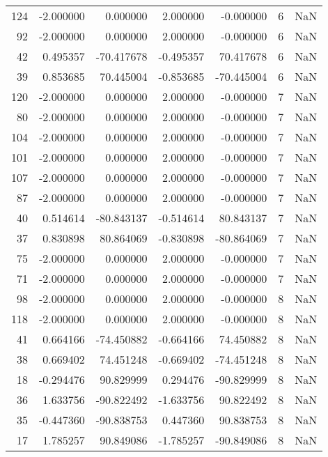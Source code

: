 \begin{tabular}{rrrrrrr}
124 & -2.000000 &    0.000000 &  2.000000 &   -0.000000 &           6 & NaN \\
 92 & -2.000000 &    0.000000 &  2.000000 &   -0.000000 &           6 & NaN \\
 42 &  0.495357 &  -70.417678 & -0.495357 &   70.417678 &           6 & NaN \\
 39 &  0.853685 &   70.445004 & -0.853685 &  -70.445004 &           6 & NaN \\
120 & -2.000000 &    0.000000 &  2.000000 &   -0.000000 &           7 & NaN \\
 80 & -2.000000 &    0.000000 &  2.000000 &   -0.000000 &           7 & NaN \\
104 & -2.000000 &    0.000000 &  2.000000 &   -0.000000 &           7 & NaN \\
101 & -2.000000 &    0.000000 &  2.000000 &   -0.000000 &           7 & NaN \\
107 & -2.000000 &    0.000000 &  2.000000 &   -0.000000 &           7 & NaN \\
 87 & -2.000000 &    0.000000 &  2.000000 &   -0.000000 &           7 & NaN \\
 40 &  0.514614 &  -80.843137 & -0.514614 &   80.843137 &           7 & NaN \\
 37 &  0.830898 &   80.864069 & -0.830898 &  -80.864069 &           7 & NaN \\
 75 & -2.000000 &    0.000000 &  2.000000 &   -0.000000 &           7 & NaN \\
 71 & -2.000000 &    0.000000 &  2.000000 &   -0.000000 &           7 & NaN \\
 98 & -2.000000 &    0.000000 &  2.000000 &   -0.000000 &           8 & NaN \\
118 & -2.000000 &    0.000000 &  2.000000 &   -0.000000 &           8 & NaN \\
 41 &  0.664166 &  -74.450882 & -0.664166 &   74.450882 &           8 & NaN \\
 38 &  0.669402 &   74.451248 & -0.669402 &  -74.451248 &           8 & NaN \\
 18 & -0.294476 &   90.829999 &  0.294476 &  -90.829999 &           8 & NaN \\
 36 &  1.633756 &  -90.822492 & -1.633756 &   90.822492 &           8 & NaN \\
 35 & -0.447360 &  -90.838753 &  0.447360 &   90.838753 &           8 & NaN \\
 17 &  1.785257 &   90.849086 & -1.785257 &  -90.849086 &           8 & NaN \\

\end{tabular}

